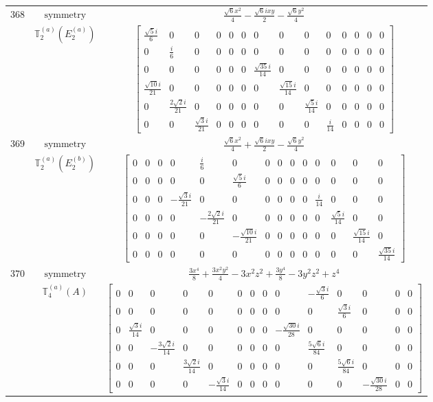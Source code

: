 \documentclass[fleqn,8pt,landscape]{jsarticle}
\begin{document}
\begin{longtable}{ccc}
$ 368 $ & $ \text{symmetry} $ & $ \frac{\sqrt{6} x^{2}}{4} - \frac{\sqrt{6} i x y}{2} - \frac{\sqrt{6} y^{2}}{4} $ \\
$  $ & $ \mathbb{T}_{2}^{(a)}(E_{2}^{(a)}) $ & $ \begin{bmatrix} \frac{\sqrt{5} i}{6} & 0 & 0 & 0 & 0 & 0 & 0 & 0 & 0 & 0 & 0 & 0 & 0 & 0 \\ 0 & \frac{i}{6} & 0 & 0 & 0 & 0 & 0 & 0 & 0 & 0 & 0 & 0 & 0 & 0 \\ 0 & 0 & 0 & 0 & 0 & 0 & \frac{\sqrt{35} i}{14} & 0 & 0 & 0 & 0 & 0 & 0 & 0 \\ \frac{\sqrt{10} i}{21} & 0 & 0 & 0 & 0 & 0 & 0 & \frac{\sqrt{15} i}{14} & 0 & 0 & 0 & 0 & 0 & 0 \\ 0 & \frac{2 \sqrt{2} i}{21} & 0 & 0 & 0 & 0 & 0 & 0 & \frac{\sqrt{5} i}{14} & 0 & 0 & 0 & 0 & 0 \\ 0 & 0 & \frac{\sqrt{3} i}{21} & 0 & 0 & 0 & 0 & 0 & 0 & \frac{i}{14} & 0 & 0 & 0 & 0 \end{bmatrix} $ \\ \hline
$ 369 $ & $ \text{symmetry} $ & $ \frac{\sqrt{6} x^{2}}{4} + \frac{\sqrt{6} i x y}{2} - \frac{\sqrt{6} y^{2}}{4} $ \\
$  $ & $ \mathbb{T}_{2}^{(a)}(E_{2}^{(b)}) $ & $ \begin{bmatrix} 0 & 0 & 0 & 0 & \frac{i}{6} & 0 & 0 & 0 & 0 & 0 & 0 & 0 & 0 & 0 \\ 0 & 0 & 0 & 0 & 0 & \frac{\sqrt{5} i}{6} & 0 & 0 & 0 & 0 & 0 & 0 & 0 & 0 \\ 0 & 0 & 0 & - \frac{\sqrt{3} i}{21} & 0 & 0 & 0 & 0 & 0 & 0 & \frac{i}{14} & 0 & 0 & 0 \\ 0 & 0 & 0 & 0 & - \frac{2 \sqrt{2} i}{21} & 0 & 0 & 0 & 0 & 0 & 0 & \frac{\sqrt{5} i}{14} & 0 & 0 \\ 0 & 0 & 0 & 0 & 0 & - \frac{\sqrt{10} i}{21} & 0 & 0 & 0 & 0 & 0 & 0 & \frac{\sqrt{15} i}{14} & 0 \\ 0 & 0 & 0 & 0 & 0 & 0 & 0 & 0 & 0 & 0 & 0 & 0 & 0 & \frac{\sqrt{35} i}{14} \end{bmatrix} $ \\ \hline
$ 370 $ & $ \text{symmetry} $ & $ \frac{3 x^{4}}{8} + \frac{3 x^{2} y^{2}}{4} - 3 x^{2} z^{2} + \frac{3 y^{4}}{8} - 3 y^{2} z^{2} + z^{4} $ \\
$  $ & $ \mathbb{T}_{4}^{(a)}(A) $ & $ \begin{bmatrix} 0 & 0 & 0 & 0 & 0 & 0 & 0 & 0 & 0 & - \frac{\sqrt{3} i}{6} & 0 & 0 & 0 & 0 \\ 0 & 0 & 0 & 0 & 0 & 0 & 0 & 0 & 0 & 0 & \frac{\sqrt{3} i}{6} & 0 & 0 & 0 \\ 0 & \frac{\sqrt{3} i}{14} & 0 & 0 & 0 & 0 & 0 & 0 & - \frac{\sqrt{30} i}{28} & 0 & 0 & 0 & 0 & 0 \\ 0 & 0 & - \frac{3 \sqrt{2} i}{14} & 0 & 0 & 0 & 0 & 0 & 0 & \frac{5 \sqrt{6} i}{84} & 0 & 0 & 0 & 0 \\ 0 & 0 & 0 & \frac{3 \sqrt{2} i}{14} & 0 & 0 & 0 & 0 & 0 & 0 & \frac{5 \sqrt{6} i}{84} & 0 & 0 & 0 \\ 0 & 0 & 0 & 0 & - \frac{\sqrt{3} i}{14} & 0 & 0 & 0 & 0 & 0 & 0 & - \frac{\sqrt{30} i}{28} & 0 & 0 \end{bmatrix} $ \\ \hline

\end{longtable}
\end{document}
